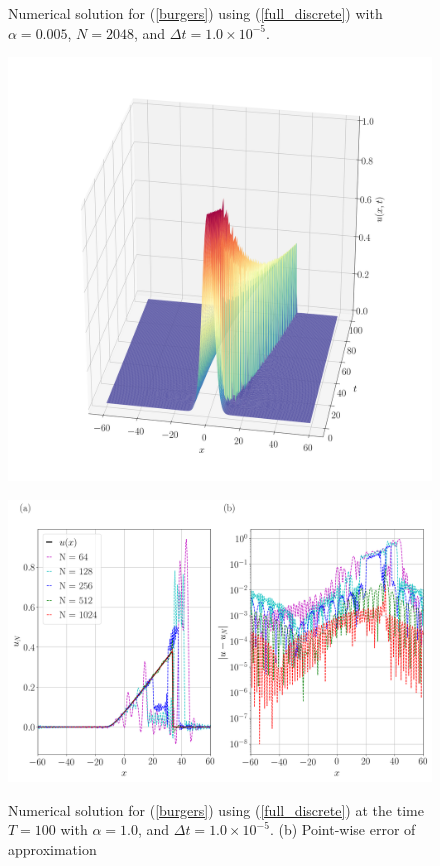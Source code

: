 	\begin{figure}[H]
		\centering
		\caption{Numerical solution for (\ref{burgers}) using (\ref{full_discrete}) with $\alpha = 0.005$, $N=2048$, and $\Delta t = 1.0 \times 10^{-5}$.}
		\includegraphics[width=12cm]{Figures/Galerkin/Graphics/eps=0.005/Numerical_Solution_alpha=0005.png}
		\caption{Numerical solution for (\ref{burgers}) using (\ref{full_discrete}) at the time $T = 100$ with $\alpha = 1.0$, and $\Delta t = 1.0 \times 10^{-5}$. (b) Point-wise error of approximation}
		\includegraphics[width=12.5cm]{Figures/Galerkin/Graphics/eps=0.005/Numerical_Solution_alpha=0005_T=100.png}
		\label{Galerkin_alpha=005_T}
	\end{figure}
	
